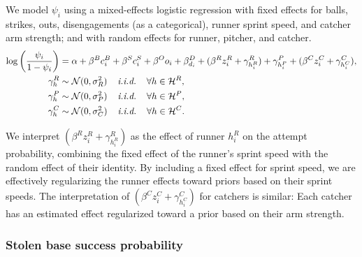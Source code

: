 \documentclass[11pt]{article}
\begin{document}
        We model $\psi_i$ using a mixed-effects logistic regression with fixed effects for balls, strikes, outs, disengagements (as a categorical), runner sprint speed, and catcher arm strength; and with random effects for runner, pitcher, and catcher.
        \begin{align}
          \label{eqn:prob-sb-attempt}
          \begin{split}
            \log\left(\frac{\psi_i}{1 - \psi_i}\right) &= \alpha + \beta^B c_i^B + \beta^S c_i^S + \beta^O o_i + \beta^D_{d_i} + (\beta^R z_i^R + \gamma^R_{h_i^R}) + \gamma^P_{h_i^P} + (\beta^C z_i^C + \gamma^C_{h_i^C}),\\
            \gamma^R_{h} &\sim \mathcal{N}(0, \sigma^2_R) \hspace{4mm} \mbox{\it i.i.d.} \hspace{4mm} \forall h \in \mathcal{H}^R,\\
            \gamma^P_{h} &\sim \mathcal{N}(0, \sigma^2_P) \hspace{4mm} \mbox{\it i.i.d.} \hspace{4mm} \forall h \in \mathcal{H}^P,\\
            \gamma^C_{h} &\sim \mathcal{N}(0, \sigma^2_C) \hspace{4mm} \mbox{\it i.i.d.} \hspace{4mm} \forall h \in \mathcal{H}^C.
          \end{split}
        \end{align}
 
        We interpret $(\beta^R z_i^R + \gamma^R_{h_i^R})$ as the effect of runner $h_i^R$ on the attempt probability, combining the fixed effect of the runner's sprint speed with the random effect of their identity. By including a fixed effect for sprint speed, we are effectively regularizing the runner effects toward priors based on their sprint speeds. The interpretation of $(\beta^C z_i^C + \gamma^C_{h_i^C})$ for catchers is similar: Each catcher has an estimated effect regularized toward a prior based on their arm strength.
      
      \subsubsection{Stolen base success probability}
      \label{sec:prob-sb-success}
\end{document}
